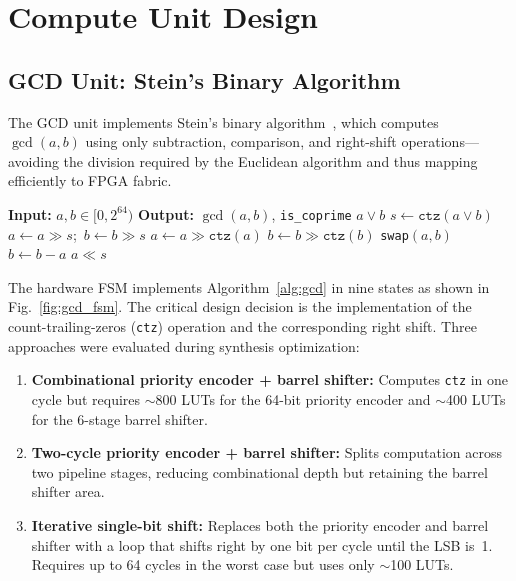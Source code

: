 \documentclass[lettersize,journal]{IEEEtran}
\begin{document}
\section{Compute Unit Design}
\label{sec:compute}

\subsection{GCD Unit: Stein's Binary Algorithm}

The GCD unit implements Stein's binary algorithm~\cite{stein1967}, which computes $\gcd(a, b)$ using only subtraction, comparison, and right-shift operations---avoiding the division required by the Euclidean algorithm and thus mapping efficiently to FPGA fabric.

\begin{algorithm}[!t]
\caption{Stein's Binary GCD (Hardware FSM)}\label{alg:gcd}
\begin{algorithmic}
\STATE \textbf{Input:} $a, b \in [0, 2^{64})$
\STATE \textbf{Output:} $\gcd(a, b)$, \texttt{is\_coprime}
    \RETURN $a \lor b$
\ENDIF
\STATE $s \gets \texttt{ctz}(a \lor b)$ 
\STATE $a \gets a \gg s$;~$b \gets b \gg s$
\STATE $a \gets a \gg \texttt{ctz}(a)$ 
\REPEAT
    \STATE $b \gets b \gg \texttt{ctz}(b)$ 
        \STATE \texttt{swap}$(a, b)$
    \ENDIF
    \STATE $b \gets b - a$
\RETURN $a \ll s$
\end{algorithmic}
\end{algorithm}

The hardware FSM implements Algorithm~\ref{alg:gcd} in nine states as shown in Fig.~\ref{fig:gcd_fsm}. The critical design decision is the implementation of the count-trailing-zeros (\texttt{ctz}) operation and the corresponding right shift. Three approaches were evaluated during synthesis optimization:

\begin{enumerate}
\item \textbf{Combinational priority encoder + barrel shifter:} Computes \texttt{ctz} in one cycle but requires $\sim$800 LUTs for the 64-bit priority encoder and $\sim$400 LUTs for the 6-stage barrel shifter.
\item \textbf{Two-cycle priority encoder + barrel shifter:} Splits computation across two pipeline stages, reducing combinational depth but retaining the barrel shifter area.
\item \textbf{Iterative single-bit shift:} Replaces both the priority encoder and barrel shifter with a loop that shifts right by one bit per cycle until the LSB is~1. Requires up to 64 cycles in the worst case but uses only $\sim$100 LUTs.
\end{enumerate}
\end{document}
